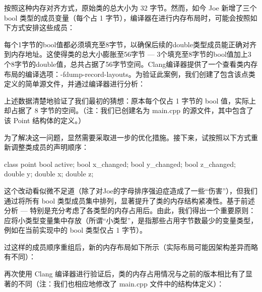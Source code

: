 按照这种内存对齐方式，原始类的总大小为 32 字节。然而，如今 Joe 新增了三个 bool 类型的成员变量（每个占 1 字节），编译器在进行内存布局时，可能会按照如下方式安排这些成员：


每个1字节的bool值都必须填充至8字节，以确保后续的double类型成员能正确对齐到内存地址。这使得类的总大小膨胀至56字节 --- 3个填充至8字节的bool值加上3个8字节的double值，总共占据了56字节空间。Clang编译器提供了一个查看类内存布局的编译选项：-fdump-record-layouts。为验证此案例，我们创建了包含该点类定义的简单源文件，并通过编译器进行分析：


上述数据清楚地验证了我们最初的猜想：原本每个仅占 1 字节的 bool 值，实际上却占据了 8 字节的空间。（注：我们已创建名为 main.cpp 的源文件，其中包含了该 Point 结构体的定义。）

为了解决这一问题，显然需要采取进一步的优化措施。接下来，试按照以下方式重新调整类成员的声明顺序：

\begin{cpp}
class point {
bool active;
bool x_changed;
bool y_changed;
bool z_changed;
double y;
double x;
double z;
}
\end{cpp}

这个改动看似微不足道（除了对Joe的字母排序强迫症造成了一些“伤害”），但我们通过将所有 bool 类型成员集中排列，显著提升了类的内存结构紧凑性。基于前述分析 --- 特别是充分考虑了各类型的内存占用后。由此，我们得出一个重要原则：应将小类型变量集中存放（所谓“小类型”，是指那些占用字节数最少的变量类型，例如在当前实现中的 bool 类型仅占 1 字节）。

过这样的成员顺序重组后，新的内存布局如下所示（实际布局可能因架构差异而略有不同）：


再次使用 Clang 编译器进行验证后，类的内存占用情况与之前的版本相比有了显著的不同（注：我们也相应地修改了 main.cpp 文件中的结构体定义）：

